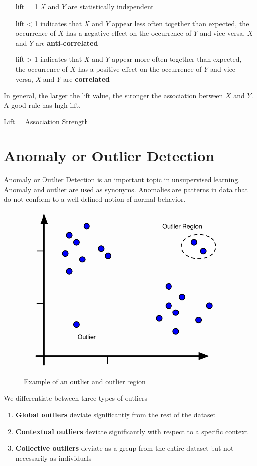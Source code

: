 \documentclass[a4paper, 11pt]{article}
\begin{document}
\begin{itemize}[leftmargin=*, labelindent=3cm, labelsep=1cm]
	\item[lift = 1] $X$ and $Y$ are statistically independent
	\item[lift < 1] indicates that $X$ and $Y$ appear less often together than expected, the occurrence of $X$ has a negative effect on the occurrence of $Y$ and vice-versa, $X$ and $Y$ are \textbf{anti-correlated}
	\item[lift > 1] indicates that $X$ and $Y$ appear more often together than expected, the occurrence of $X$ has a positive effect on the occurrence of $Y$ and vice-versa, $X$ and $Y$ are \textbf{correlated}
\end{itemize}

In general, the larger the lift value, the stronger the association between $X$ and $Y$. A good rule has high lift.

\begin{theorem}
	Lift = Association Strength
\end{theorem}

\section{Anomaly or Outlier Detection}

Anomaly or Outlier Detection is an important topic in unsupervised learning. Anomaly and outlier are used as synonyms. Anomalies are patterns in data that do not conform to a well-defined notion of normal behavior.

\begin{figure}[tbh!]
    \centering
    \includegraphics[width=0.4\linewidth, keepaspectratio]{Pictures/outlier_examples}
    \caption{Example of an outlier and outlier region}
    \label{fig:outlierexamples}
\end{figure}

We differentiate between three types of outliers

\begin{enumerate}
    \item \textbf{Global outliers} deviate significantly from the rest of the dataset
    \item \textbf{Contextual outliers} deviate significantly with respect to a specific context
    \item \textbf{Collective outliers} deviate as a group from the entire dataset but not necessarily as individuals
\end{enumerate}
\end{document}
